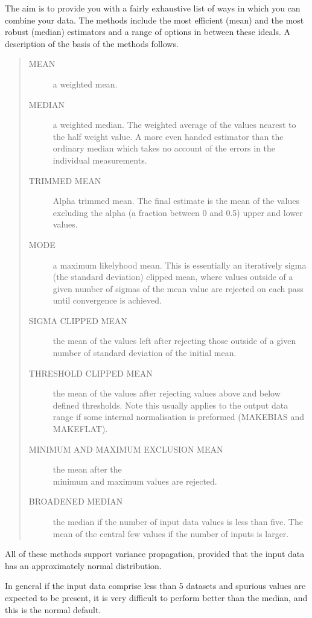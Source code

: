 The aim is to provide you with a fairly exhaustive list of ways in which
you can combine your data. The methods include the most efficient 
(mean) and the most robust (median) estimators and a range of options 
in between these ideals. A description of the basis of the methods 
follows.

\begin{quote}
\begin{description}
\item[MEAN] a weighted mean.
\item[MEDIAN] a weighted median. The weighted average of the values nearest to
the half weight value. A more even handed estimator than the ordinary median
which takes no account of the errors in the individual measurements. 
\item[TRIMMED MEAN] Alpha trimmed mean. The final estimate is the mean of the
values excluding the alpha (a fraction between 0 and 0.5) upper and lower
values.
\item[MODE] a maximum likelyhood mean. This is essentially an iteratively sigma
(the standard deviation) clipped mean, where values outside of a given number of
sigmas of the mean value are rejected on each pass until convergence is
achieved.
\item[SIGMA CLIPPED MEAN]  the mean of the values left after rejecting those
outside of a given number of standard deviation of the initial mean.
\item[THRESHOLD CLIPPED MEAN] the mean of the values after rejecting
values above and below defined thresholds. Note this usually applies to
the output data range if some internal normalisation is preformed
(MAKEBIAS and
MAKEFLAT).
\item[MINIMUM AND MAXIMUM EXCLUSION MEAN] the mean after the \\ minimum and
maximum values are rejected. 
\item[BROADENED MEDIAN] the median if the number of input data values is
less than five. The mean of the central few values if the number of inputs is
larger.
\end{description}
\end{quote}

All of these methods support variance propagation, provided that the input data
has an approximately normal distribution.

In general if the input data comprise less than 5 datasets and spurious values
are expected to be present, it is very difficult to perform better than the
median, and this is the normal default.

